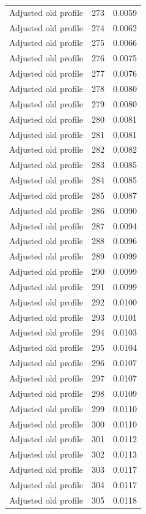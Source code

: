 \begin{table}[htbp]
\begin{tabular}{lll}
Adjusted old profile & 273 & 0.0059 \\
Adjusted old profile & 274 & 0.0062 \\
Adjusted old profile & 275 & 0.0066 \\
Adjusted old profile & 276 & 0.0075 \\
Adjusted old profile & 277 & 0.0076 \\
Adjusted old profile & 278 & 0.0080 \\
Adjusted old profile & 279 & 0.0080 \\
Adjusted old profile & 280 & 0.0081 \\
Adjusted old profile & 281 & 0.0081 \\
Adjusted old profile & 282 & 0.0082 \\
Adjusted old profile & 283 & 0.0085 \\
Adjusted old profile & 284 & 0.0085 \\
Adjusted old profile & 285 & 0.0087 \\
Adjusted old profile & 286 & 0.0090 \\
Adjusted old profile & 287 & 0.0094 \\
Adjusted old profile & 288 & 0.0096 \\
Adjusted old profile & 289 & 0.0099 \\
Adjusted old profile & 290 & 0.0099 \\
Adjusted old profile & 291 & 0.0099 \\
Adjusted old profile & 292 & 0.0100 \\
Adjusted old profile & 293 & 0.0101 \\
Adjusted old profile & 294 & 0.0103 \\
Adjusted old profile & 295 & 0.0104 \\
Adjusted old profile & 296 & 0.0107 \\
Adjusted old profile & 297 & 0.0107 \\
Adjusted old profile & 298 & 0.0109 \\
Adjusted old profile & 299 & 0.0110 \\
Adjusted old profile & 300 & 0.0110 \\
Adjusted old profile & 301 & 0.0112 \\
Adjusted old profile & 302 & 0.0113 \\
Adjusted old profile & 303 & 0.0117 \\
Adjusted old profile & 304 & 0.0117 \\
Adjusted old profile & 305 & 0.0118 \\

\end{tabular}
\end{table}
